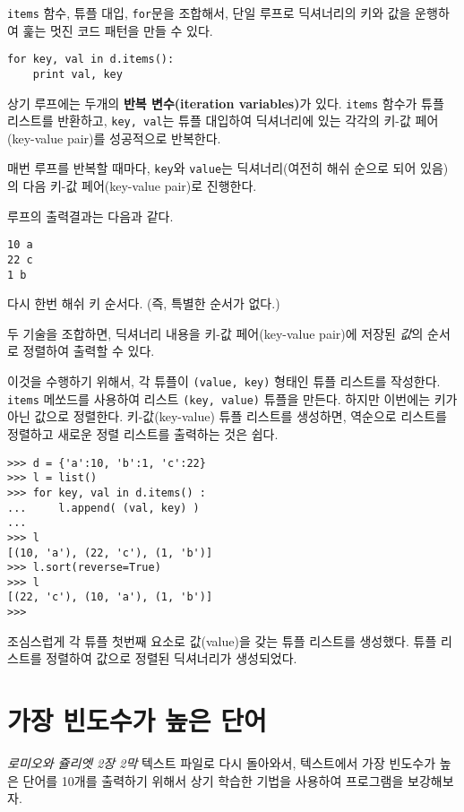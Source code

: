 {\tt items} 함수, 튜플 대입, {\tt for}문을 조합해서, 
단일 루프로 딕셔너리의 키와 값을 운행하여 훑는 멋진 코드 패턴을 만들 수 있다.

\beforeverb
\begin{verbatim}
for key, val in d.items():
    print val, key
\end{verbatim}
\afterverb
%

상기 루프에는 두개의 {\bf 반복 변수(iteration variables)}가 있다.
{\tt items} 함수가 튜플 리스트를 반환하고, {\tt key, val}는 튜플 대입하여 딕셔너리에 있는 각각의 키-값 페어(key-value pair)를 성공적으로 반복한다.

매번 루프를 반복할 때마다, {\tt key}와 {\tt value}는 딕셔너리(여전히 해쉬 순으로 되어 있음)의 다음 키-값 페어(key-value pair)로 진행한다.

루프의 출력결과는 다음과 같다.

\beforeverb
\begin{verbatim}
10 a
22 c
1 b
\end{verbatim}
\afterverb
%

다시 한번 해쉬 키 순서다. (즉, 특별한 순서가 없다.)

두 기술을 조합하면, 딕셔너리 내용을 키-값 페어(key-value pair)에 저장된 \emph{값}의 순서로 정렬하여 출력할 수 있다.

이것을 수행하기 위해서, 각 튜플이 {\tt (value, key)} 형태인 튜플 리스트를 작성한다. 
{\tt items} 메쏘드를 사용하여 리스트 {\tt (key, value)} 튜플을 만든다. 
하지만 이번에는 키가 아닌 값으로 정렬한다.
키-값(key-value) 튜플 리스트를 생성하면, 역순으로 리스트를 정렬하고 새로운 정렬 리스트를 출력하는 것은 쉽다.

\beforeverb
\begin{verbatim}
>>> d = {'a':10, 'b':1, 'c':22}
>>> l = list()
>>> for key, val in d.items() :
...     l.append( (val, key) )
... 
>>> l
[(10, 'a'), (22, 'c'), (1, 'b')]
>>> l.sort(reverse=True)
>>> l
[(22, 'c'), (10, 'a'), (1, 'b')]
>>> 
\end{verbatim}
\afterverb
%

조심스럽게 각 튜플 첫번째 요소로 값(value)을 갖는 튜플 리스트를 생성했다. 
튜플 리스트를 정렬하여 값으로 정렬된 딕셔너리가 생성되었다.

\section{가장 빈도수가 높은 단어}


\emph{로미오와 쥴리엣 2장 2막} 텍스트 파일로 다시 돌아와서, 텍스트에서 가장 빈도수가 높은 단어를 10개를 출력하기 위해서
상기 학습한 기법을 사용하여 프로그램을 보강해보자.

